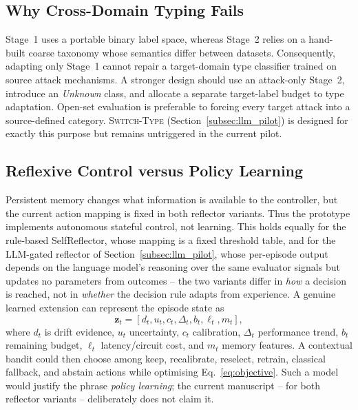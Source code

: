 \documentclass[conference]{IEEEtran}
\begin{document}
\subsection{Why Cross-Domain Typing Fails}

Stage~1 uses a portable binary label space, whereas Stage~2 relies on a
hand-built coarse taxonomy whose semantics differ between datasets.
Consequently, adapting only Stage~1 cannot repair a target-domain type
classifier trained on source attack mechanisms. A stronger design should
use an attack-only Stage~2, introduce an \emph{Unknown} class, and
allocate a separate target-label budget to type adaptation. Open-set
evaluation is preferable to forcing every target attack into a
source-defined category. \textsc{Switch-Type} (Section~\ref{subsec:llm_pilot})
is designed for exactly this purpose but remains untriggered in the
current pilot.

\subsection{Reflexive Control versus Policy Learning}
\label{subsec:policy_learning}

Persistent memory changes what information is available to the
controller, but the current action mapping is fixed in both reflector
variants. Thus the prototype implements autonomous stateful control, not
learning. This holds equally for the rule-based SelfReflector, whose
mapping is a fixed threshold table, and for the LLM-gated reflector of
Section~\ref{subsec:llm_pilot}, whose per-episode output depends on the
language model's reasoning over the same evaluator signals but updates no
parameters from outcomes -- the two variants differ in \emph{how} a
decision is reached, not in \emph{whether} the decision rule adapts from
experience. A genuine learned extension can represent the episode state
as
\begin{equation}
\mathbf{z}_t = [d_t, u_t, c_t, \Delta_t, b_t, \ell_t, m_t],
\label{eq:state}
\end{equation}
where $d_t$ is drift evidence, $u_t$ uncertainty, $c_t$ calibration,
$\Delta_t$ performance trend, $b_t$ remaining budget, $\ell_t$
latency/circuit cost, and $m_t$ memory features. A contextual bandit
could then choose among keep, recalibrate, reselect, retrain, classical
fallback, and abstain actions while optimising Eq.~\eqref{eq:objective}.
Such a model would justify the phrase \emph{policy learning}; the current
manuscript -- for both reflector variants -- deliberately does not claim
it.
\end{document}
